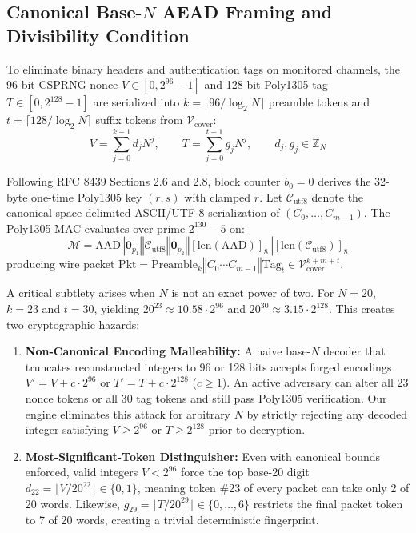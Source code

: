 \documentclass[conference]{IEEEtran}
\begin{document}
\subsection{Canonical Base-$N$ AEAD Framing and Divisibility Condition}
To eliminate binary headers and authentication tags on monitored channels, the 96-bit CSPRNG nonce $V \in [0, 2^{96}-1]$ and 128-bit Poly1305 tag $T \in [0, 2^{128}-1]$ are serialized into $k = \lceil 96 / \log_2 N \rceil$ preamble tokens and $t = \lceil 128 / \log_2 N \rceil$ suffix tokens from $\mathcal{V}_{\text{cover}}$:
\begin{equation}
V = \sum_{j=0}^{k-1} d_j N^j, \qquad T = \sum_{j=0}^{t-1} g_j N^j, \qquad d_j, g_j \in \mathbb{Z}_N
\end{equation}

Following RFC 8439 Sections 2.6 and 2.8, block counter $b_0 = 0$ derives the 32-byte one-time Poly1305 key $(r, s)$ with clamped $r$. Let $\mathcal{C}_{\text{utf8}}$ denote the canonical space-delimited ASCII/UTF-8 serialization of $(C_0, \dots, C_{m-1})$. The Poly1305 MAC evaluates over prime $2^{130}-5$ on:
\begin{equation}
\mathcal{M} = \text{AAD} \mathbin{\Vert} \mathbf{0}_{p_1} \mathbin{\Vert} \mathcal{C}_{\text{utf8}} \mathbin{\Vert} \mathbf{0}_{p_2} \mathbin{\Vert} [\text{len}(\text{AAD})]_8 \mathbin{\Vert} [\text{len}(\mathcal{C}_{\text{utf8}})]_8
\end{equation}
producing wire packet $\text{Pkt} = \text{Preamble}_k \mathbin{\Vert} C_0 \cdots C_{m-1} \mathbin{\Vert} \text{Tag}_t \in \mathcal{V}_{\text{cover}}^{k+m+t}$.

A critical subtlety arises when $N$ is not an exact power of two. For $N=20$, $k=23$ and $t=30$, yielding $20^{23} \approx 10.58 \cdot 2^{96}$ and $20^{30} \approx 3.15 \cdot 2^{128}$. This creates two cryptographic hazards:
\begin{enumerate}
    \item \textbf{Non-Canonical Encoding Malleability:} A naive base-$N$ decoder that truncates reconstructed integers to 96 or 128 bits accepts forged encodings $V' = V + c \cdot 2^{96}$ or $T' = T + c \cdot 2^{128}$ ($c \ge 1$). An active adversary can alter all 23 nonce tokens or all 30 tag tokens and still pass Poly1305 verification. Our engine eliminates this attack for arbitrary $N$ by strictly rejecting any decoded integer satisfying $V \ge 2^{96}$ or $T \ge 2^{128}$ prior to decryption.
    \item \textbf{Most-Significant-Token Distinguisher:} Even with canonical bounds enforced, valid integers $V < 2^{96}$ force the top base-20 digit $d_{22} = \lfloor V / 20^{22} \rfloor \in \{0, 1\}$, meaning token \#23 of every packet can take only 2 of 20 words. Likewise, $g_{29} = \lfloor T / 20^{29} \rfloor \in \{0, \dots, 6\}$ restricts the final packet token to 7 of 20 words, creating a trivial deterministic fingerprint.
\end{enumerate}
\end{document}
